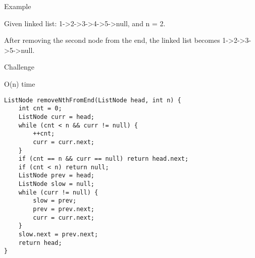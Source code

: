 \documentclass[12pt]{book}
\begin{document}
Example

Given linked list: 1->2->3->4->5->null, and n = 2.

After removing the second node from the end, the linked list becomes 1->2->3->5->null.

Challenge

O(n) time
\lstset{language=java,label= ,caption= ,numbers=none}
\begin{lstlisting}
ListNode removeNthFromEnd(ListNode head, int n) {
    int cnt = 0;
    ListNode curr = head;
    while (cnt < n && curr != null) {
        ++cnt;
        curr = curr.next;
    }
    if (cnt == n && curr == null) return head.next;
    if (cnt < n) return null;
    ListNode prev = head;
    ListNode slow = null;
    while (curr != null) {
        slow = prev;
        prev = prev.next;
        curr = curr.next;
    }
    slow.next = prev.next;
    return head;
}
\end{lstlisting}
\end{document}

